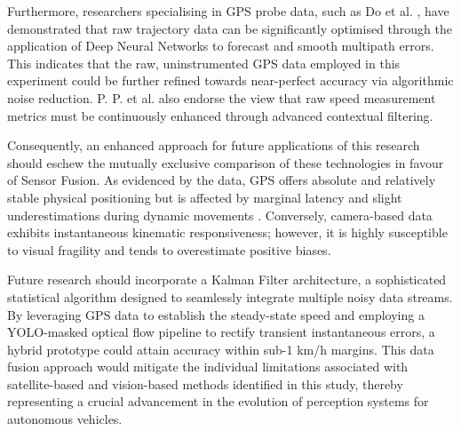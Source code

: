 Furthermore, researchers specialising in GPS probe data, such as Do et al. \cite{do2024enhanced}, have demonstrated that raw trajectory data can be significantly optimised through the application of Deep Neural Networks to forecast and smooth multipath errors. This indicates that the raw, uninstrumented GPS data employed in this experiment could be further refined towards near-perfect accuracy via algorithmic noise reduction. P. P. et al. \cite{pp2024video} also endorse the view that raw speed measurement metrics must be continuously enhanced through advanced contextual filtering.

Consequently, an enhanced approach for future applications of this research should eschew the mutually exclusive comparison of these technologies in favour of Sensor Fusion. As evidenced by the data, GPS offers absolute and relatively stable physical positioning but is affected by marginal latency and slight underestimations during dynamic movements \cite{cui2003autonomous, li2025statistical}. Conversely, camera-based data exhibits instantaneous kinematic responsiveness; however, it is highly susceptible to visual fragility and tends to overestimate positive biases.

Future research should incorporate a Kalman Filter architecture, a sophisticated statistical algorithm designed to seamlessly integrate multiple noisy data streams. By leveraging GPS data to establish the steady-state speed and employing a YOLO-masked optical flow pipeline to rectify transient instantaneous errors, a hybrid prototype could attain accuracy within sub-1 km/h margins. This data fusion approach would mitigate the individual limitations associated with satellite-based and vision-based methods identified in this study, thereby representing a crucial advancement in the evolution of perception systems for autonomous vehicles.